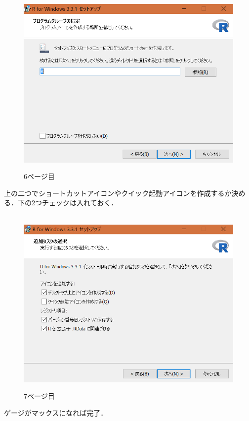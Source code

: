 \begin{figure}[!htbp]
\centering　
\includegraphics[width=13cm]{rinstall6.png}
\caption{6ページ目}
\end{figure}

\newpage

上の二つでショートカットアイコンやクイック起動アイコンを作成するか決める．下の2つチェックは入れておく．

\begin{figure}[!htbp]
\centering　
\includegraphics[width=13cm]{rinstall7.png}
\caption{7ページ目}
\end{figure}

\newpage

ゲージがマックスになれば完了．

